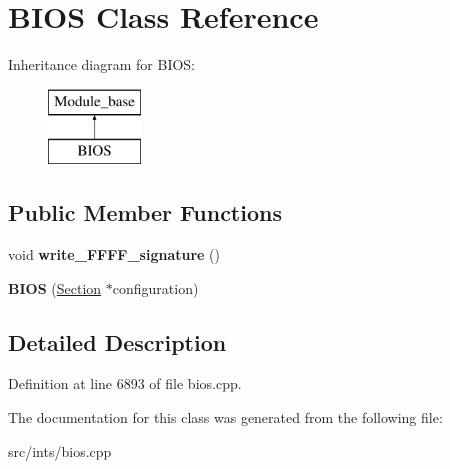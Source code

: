 \hypertarget{classBIOS}{\section{B\-I\-O\-S Class Reference}
\label{classBIOS}
}
Inheritance diagram for B\-I\-O\-S\-:\begin{figure}[H]
\begin{center}
\leavevmode
\includegraphics[height=2.000000cm]{classBIOS}
\end{center}
\end{figure}
\subsection*{Public Member Functions}
\begin{DoxyCompactItemize}
\item 
\hypertarget{classBIOS_ae2cf67c9872366656b32695ce56b3c0a}{void {\bfseries write\-\_\-\-F\-F\-F\-F\-\_\-signature} ()}\label{classBIOS_ae2cf67c9872366656b32695ce56b3c0a}

\item 
\hypertarget{classBIOS_a04ed247011d175b84c556487820fd64c}{{\bfseries B\-I\-O\-S} (\hyperlink{classSection}{Section} $\ast$configuration)}\label{classBIOS_a04ed247011d175b84c556487820fd64c}

\end{DoxyCompactItemize}


\subsection{Detailed Description}


Definition at line 6893 of file bios.\-cpp.



The documentation for this class was generated from the following file\-:\begin{DoxyCompactItemize}
\item 
src/ints/bios.\-cpp\end{DoxyCompactItemize}
